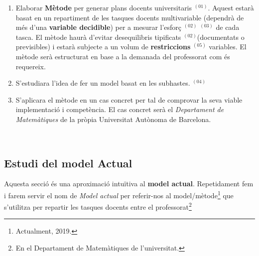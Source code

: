 \documentclass[10pt]{proc}
\begin{document}
\begin{tcolorbox}[colback=black!1,title=\textbf{0bjectius},coltitle=black,colbacktitle=black!10]
	\begin{enumerate}
	\item Elaborar \textbf{Mètode} per generar plans docents universitaris{\color{cyan!80} $^{(01)}$}. Aquest estarà basat en un repartiment de les tasques docents multivariable (dependrà de més d'una \textbf{variable decidible}) per a mesurar l'esforç{\color{blue!80} $^{(02)}$}{\color{green!80} $^{(03)}$} de cada tasca. El mètode haurà d'evitar desequilibris tipificats{\color{blue!80} $^{(02)}$}(documentats o previsibles) i estarà subjecte a un volum de \textbf{restriccions}{\color{violet!60} $^{(05)}$} variables. El mètode serà estructurat en base a la demanada del professorat com és requereix.
	\item S'estudiara l'idea de fer un model  basat en les subhastes.{\color{purple!80} $^{(04)}$} 
	\item S'aplicara el mètode en un cas concret per tal de comprovar la seva viable implementació i competència. El cas concret serà el \textit{Departament de Matemàtiques} de la pròpia Universitat Autònoma de Barcelona.
	\end{enumerate}
\end{tcolorbox}
\\
\newpage
\begin{tcolorbox}[colframe=white,colback=redviolet!20,sharp corners=all,size=minimal,halign=center,valign=center]
\section{Estudi del model Actual}
\end{tcolorbox}
\lettrine{A}questa secció és una aproximació intuïtiva al \textbf{model actual}. Repetidament fem i farem servir el nom de \textit{Model actual}  per referir-nos al model/mètode\footnote{Actualment, 2019.} que s'utilitza per repartir les tasques docents entre el professorat\footnote{En el Departament de Matemàtiques de l'universitat.}
\end{document}
